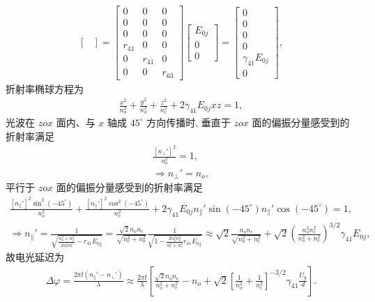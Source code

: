 \documentclass{assignment}
\begin{document}
\begin{pf}
\begin{align}
\begin{bmatrix}
        \end{bmatrix}=\begin{bmatrix}
            0&0&0\\
            0&0&0\\
            0&0&0\\
            r_{41}&0&0\\
            0&r_{41}&0\\
            0&0&r_{63}
        \end{bmatrix}\begin{bmatrix}
            E_{0j}\\
            0\\
            0
        \end{bmatrix}=\begin{bmatrix}
            0\\
            0\\
            0\\
            0\\
            \gamma_{41}E_{0j}\\
            0
        \end{bmatrix},
    \end{align}
    折射率椭球方程为
    \begin{align}
        \frac{x^2}{n_o^2}+\frac{y^2}{n_o^2}+\frac{z^2}{n_e^2}+2\gamma_{41}E_{0j}xz=1,
    \end{align}
    光波在 $zox$ 面内、与 $x$ 轴成 $45^{\circ}$ 方向传播时, 垂直于 $zox$ 面的偏振分量感受到的折射率满足
    \begin{align}
        \frac{[n_{\perp}']^2}{n_o^2}=1,\\
        \Longrightarrow n_{\perp}'=n_o,
    \end{align}
    平行于 $zox$ 面的偏振分量感受到的折射率满足
    \begin{gather}
        \frac{[n_{\parallel}']^2\sin^2(-45^{\circ})}{n_o^2}+\frac{[n_{\parallel}']^2\cos^2(-45^{\circ})}{n_e^2}+2\gamma_{41}E_{0j}n_{\parallel}'\sin(-45^{\circ})n_{\parallel}'\cos(-45^{\circ})=1,\\
        \Longrightarrow n_{\parallel}'=\frac{1}{\sqrt{\frac{n_o^2+n_e^2}{2n_o^2n_e^2}-r_{41}E_{0j}}}=\frac{\sqrt{2}n_on_e}{\sqrt{n_e^2+n_o^2}}\frac{1}{\sqrt{1-\frac{2n_o^2n_e^2}{n_e^2+n_o^2}r_{41}E_{0j}}}\approx\sqrt{2}\frac{n_on_e}{\sqrt{n_o^2+n_e^2}}+\sqrt{2}\left(\frac{n_o^2n_e^2}{n_o^2+n_e^2}\right)^{3/2}\gamma_{41}E_{0j},
    \end{gather}
    故电光延迟为
    \begin{align}
        \Delta\varphi=\frac{2\pi l(n_{\parallel}'-n_{\perp}')}{\lambda}\approx\frac{2\pi l}{\lambda}\left[\frac{\sqrt{2}n_on_e}{n_o^2+n_e^2}-n_o+\sqrt{2}\left[\frac{1}{n_o^2}+\frac{1}{n_e^2}\right]^{-3/2}\gamma_{41}\frac{U_y}{d}\right].
    \end{align}
\end{pf}
\end{document}
